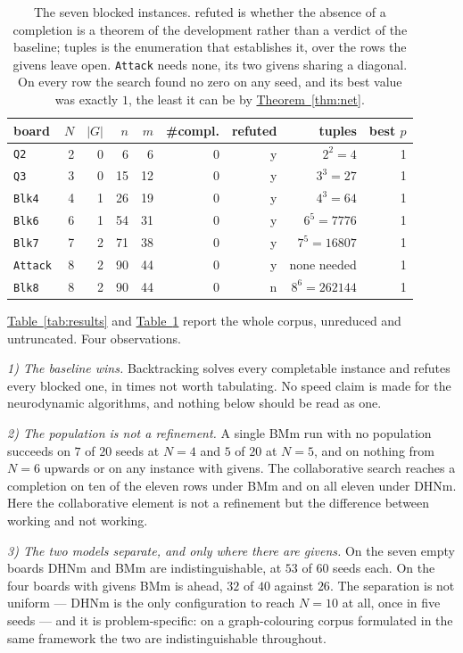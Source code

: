 \documentclass{easychair}
\newcommand{\thmref}[1]{\textcolor{academicpurple}{\hyperref[#1]{Theorem~\ref*{#1}}}}
\newcommand{\tabref}[1]{\textcolor{academicpurple}{\hyperref[#1]{Table~\ref*{#1}}}}
\begin{document}
\begin{table}[t]
\centering\footnotesize
\setlength{\tabcolsep}{4.5pt}
\begin{tabular}{@{}lrrrr rr rr@{}}
\toprule
board & $N$ & $|G|$ & $n$ & $m$ & \#compl. & refuted & tuples & best $p$\\
\midrule
\texttt{Q2}     & 2 & 0 & 6  & 6  & 0 & y & $2^2 = 4$      & 1\\
\texttt{Q3}     & 3 & 0 & 15 & 12 & 0 & y & $3^3 = 27$     & 1\\
\texttt{Blk4}   & 4 & 1 & 26 & 19 & 0 & y & $4^3 = 64$     & 1\\
\texttt{Blk6}   & 6 & 1 & 54 & 31 & 0 & y & $6^5 = 7776$   & 1\\
\texttt{Blk7}   & 7 & 2 & 71 & 38 & 0 & y & $7^5 = 16807$  & 1\\
\texttt{Attack} & 8 & 2 & 90 & 44 & 0 & y & none needed    & 1\\
\texttt{Blk8}   & 8 & 2 & 90 & 44 & 0 & n & $8^6 = 262144$ & 1\\
\bottomrule
\end{tabular}
\caption{The seven blocked instances. \textsf{refuted} is whether the absence of a completion is a
theorem of the development rather than a verdict of the baseline; \textsf{tuples} is the enumeration
that establishes it, over the rows the givens leave open. \texttt{Attack} needs none, its two givens
sharing a diagonal. On every row the search found no zero on any seed, and its best value was exactly
$1$, the least it can be by \thmref{thm:net}.}\label{tab:blocked}
\end{table}

\tabref{tab:results} and \tabref{tab:blocked} report the whole corpus, unreduced and untruncated.
Four observations.

\emph{1) The baseline wins.} Backtracking solves every completable instance and refutes every blocked
one, in times not worth tabulating. No speed claim is made for the neurodynamic algorithms, and
nothing below should be read as one.

\emph{2) The population is not a refinement.} A single BMm run with no population succeeds on $7$ of
$20$ seeds at $N = 4$ and $5$ of $20$ at $N = 5$, and on nothing from $N = 6$ upwards or on any
instance with givens. The collaborative search reaches a completion on ten of the eleven rows under
BMm and on all eleven under DHNm. Here the collaborative element is not a refinement but the
difference between working and not working.

\emph{3) The two models separate, and only where there are givens.} On the seven empty boards DHNm
and BMm are indistinguishable, at $53$ of $60$ seeds each. On the four boards with givens BMm is
ahead, $32$ of $40$ against $26$. The separation is not uniform --- DHNm is the only configuration to
reach $N = 10$ at all, once in five seeds --- and it is problem-specific: on a graph-colouring corpus
formulated in the same framework the two are indistinguishable throughout.
\end{document}
